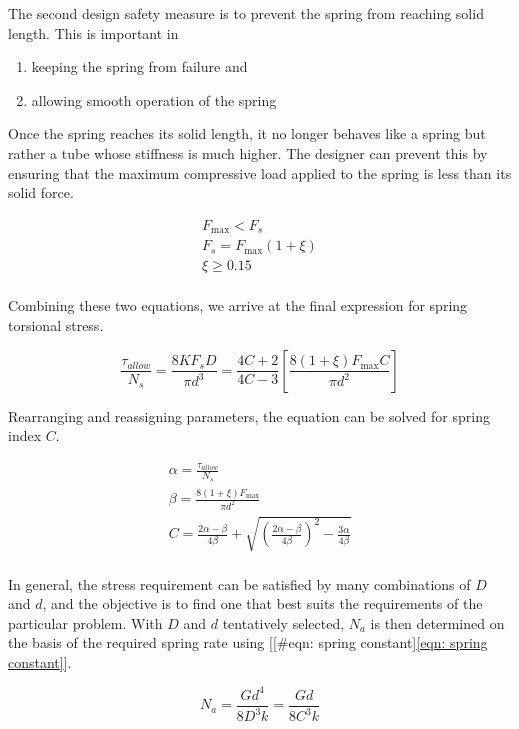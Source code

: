 \documentclass[a4paper,openany,12pt]{book}
\begin{document}
{{The second design safety measure is to prevent the spring from reaching
solid length. This is important in

\begin{enumerate}
\item keeping the spring from failure and

\item allowing smooth operation of the spring
\end{enumerate}

Once the spring reaches its solid length, it no longer behaves like a
spring but rather a tube whose stiffness is much higher. The designer
can prevent this by ensuring that the maximum compressive load applied
to the spring is less than its solid force.

$$\begin{gathered}
    F_{\max} < F_s \\ 
    F_s = F_{\max}(1 + \xi ) \\ 
    \xi  \geqslant 0.15 \\ 
  \end{gathered}$$

Combining these two equations, we arrive at the final expression for
spring torsional stress.

$$\frac{\tau _{allow}}{N_s} = \frac{8KF_sD}{\pi d^3} = \frac{4C + 2}{4C - 3}\left[ \frac{8(1 + \xi )F_{\max }C}{\pi d^2} \right]$$

Rearranging and reassigning parameters, the equation can be solved for
spring index \(C\).

$$\begin{gathered}
    \alpha  = \frac{\tau_{allow}}{N_s} \\ 
    \beta  = \frac{8(1 + \xi )F_{\max}}{\pi d^2} \\ 
    C = \frac{2\alpha  - \beta }{4\beta} + \sqrt {\left( \frac{2\alpha  - \beta}{4\beta} \right)^2 - \frac{3\alpha}{4\beta}}  \\ 
  \end{gathered}$$

In general, the stress requirement can be satisfied by many combinations
of \(D\) and \(d\), and the objective is to find one that best suits the
requirements of the particular problem. With \(D\) and \(d\) tentatively
selected, \(N_a\) is then determined on the basis of the required spring
rate using [[\#eqn: spring constant]\ref{eqn: spring constant}].

$$N_a = \frac{Gd^4}{8D^3k} = \frac{Gd}{8C^3k}$$

}}
\end{document}
